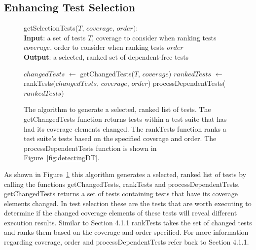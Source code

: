\subsection{Enhancing Test Selection}
\begin{figure}[t]
	getSelectionTests($\mathit{T}$, $\mathit{coverage}$, $\mathit{order}):$\\
	\textbf{Input}: a set of tests $\mathit{T}$, coverage to consider when ranking tests $\mathit{coverage}$, order to consider when ranking tests $\mathit{order}$\\
	\textbf{Output}: a selected, ranked set of dependent-free tests\\
	 \begin{algorithmic}[1]
	 	\vspace{-5mm}
	 	\STATE $\mathit{changedTests}$ $\leftarrow$ getChangedTests($\mathit{T}$, $\mathit{coverage}$)
		\STATE $\mathit{rankedTests}$ $\leftarrow$ rankTests($\mathit{changedTests}$, $\mathit{coverage}$, $\mathit{order}$)
		\RETURN processDependentTests($\mathit{rankedTests}$)
	\end{algorithmic}
	\vspace{-3mm}
	\caption {
		The algorithm to generate a selected, ranked list of tests. The getChangedTests function returns tests within a test suite that has had its coverage elements changed. The rankTests function ranks a test suite's tests based on the specified coverage and order. The processDependentTests function is shown in Figure~\ref{fig:detectingDT}.
	}
	\label{fig:selection}
\end{figure}
As shown in Figure~\ref{fig:selection} this algorithm generates a selected, ranked list of tests by calling the functions getChangedTests, rankTests and processDependentTests. getChangedTests returns a set of tests containing tests that have its coverage elements changed. In test selection these are the tests that are worth executing to determine if the changed coverage elements of these tests will reveal different execution results. Similar to Section 4.1.1 rankTests takes the set of changed tests and ranks them based on the coverage and order specified. For more information regarding coverage, order and processDependentTests refer back to Section 4.1.1.

